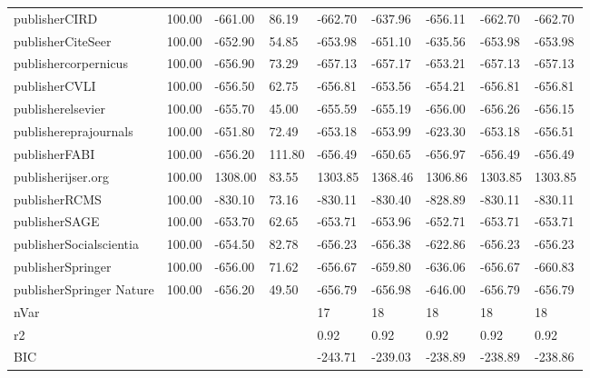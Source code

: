 \documentclass[12pt, english]{article}
\begin{document}
\begin{table}[H]
{\begin{tabular}{@{}lllllllll@{}}
                publisherCIRD               & 100.00 & -661.00 & 86.19  & -662.70 & -637.96 & -656.11 & -662.70 & -662.70 \\
                publisherCiteSeer           & 100.00 & -652.90 & 54.85  & -653.98 & -651.10 & -635.56 & -653.98 & -653.98 \\
                publishercorpernicus        & 100.00 & -656.90 & 73.29  & -657.13 & -657.17 & -653.21 & -657.13 & -657.13 \\
                publisherCVLI               & 100.00 & -656.50 & 62.75  & -656.81 & -653.56 & -654.21 & -656.81 & -656.81 \\
                publisherelsevier           & 100.00 & -655.70 & 45.00  & -655.59 & -655.19 & -656.00 & -656.26 & -656.15 \\
                publishereprajournals       & 100.00 & -651.80 & 72.49  & -653.18 & -653.99 & -623.30 & -653.18 & -656.51 \\
                publisherFABI               & 100.00 & -656.20 & 111.80 & -656.49 & -650.65 & -656.97 & -656.49 & -656.49 \\
                publisherijser.org          & 100.00 & 1308.00 & 83.55  & 1303.85 & 1368.46 & 1306.86 & 1303.85 & 1303.85 \\
                publisherRCMS               & 100.00 & -830.10 & 73.16  & -830.11 & -830.40 & -828.89 & -830.11 & -830.11 \\
                publisherSAGE               & 100.00 & -653.70 & 62.65  & -653.71 & -653.96 & -652.71 & -653.71 & -653.71 \\
                publisherSocialscientia     & 100.00 & -654.50 & 82.78  & -656.23 & -656.38 & -622.86 & -656.23 & -656.23 \\
                publisherSpringer           & 100.00 & -656.00 & 71.62  & -656.67 & -659.80 & -636.06 & -656.67 & -660.83 \\
                publisherSpringer Nature    & 100.00 & -656.20 & 49.50  & -656.79 & -656.98 & -646.00 & -656.79 & -656.79 \\
                nVar                        &        &         &        & 17      & 18      & 18      & 18      & 18      \\
                r2                          &        &         &        & 0.92    & 0.92    & 0.92    & 0.92    & 0.92    \\
                BIC                         &        &         &        & -243.71 & -239.03 & -238.89 & -238.89 & -238.86 \\

\end{tabular}}
\end{table}
\end{document}
